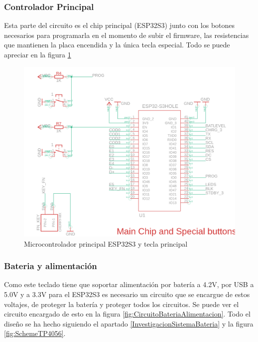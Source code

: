 \newpage
\subsubsection{Controlador Principal}
Esta parte del circuito es el chip principal (ESP32S3) junto con los botones necesarios para programarla en el momento de subir el firmware, las resistencias que mantienen la placa encendida y la única tecla especial. Todo se puede apreciar en la figura \ref{fig:ESP32S3Circuito}

\begin{figure}[H]
    \centering
    \includegraphics[width=1.0\textwidth]{imagenes/Capitulos/Cap04/CHIP.png}
    \caption{Microcontrolador principal ESP32S3 y tecla principal}
    \label{fig:ESP32S3Circuito}
\end{figure}

\newpage
\subsubsection{Bateria y alimentación}
Como este teclado tiene que soportar alimentación por batería a 4.2V, por \gls{USB} a 5.0V y a 3.3V para el ESP32S3 es necesario un circuito que se encargue de estos voltajes, de proteger la batería y proteger todos los circuitos. Se puede ver el circuito encargado de esto en la figura \ref{fig:CircuitoBateriaAlimentacion}. Todo el diseño se ha hecho siguiendo el apartado \ref{InvestigacionSistemaBateria} y la figura \ref{fig:SchemeTP4056}.

